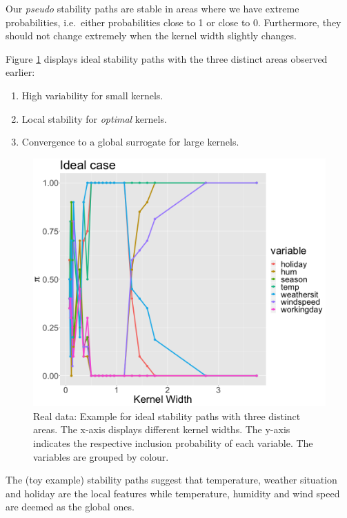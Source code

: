 \documentclass[
]{krantz}
\begin{document}
Our \emph{pseudo} stability paths are stable in areas where we have extreme probabilities, i.e.~either probabilities close to 1 or close to 0.
Furthermore, they should not change extremely when the kernel width slightly changes.

Figure \ref{fig:lime-fig131} displays ideal stability paths with the three distinct areas observed earlier:

\begin{enumerate}
\def\labelenumi{\arabic{enumi}.}
\item
  High variability for small kernels.
\item
  Local stability for \emph{optimal} kernels.
\item
  Convergence to a global surrogate for large kernels.
\end{enumerate}

\begin{figure}

{\centering \includegraphics[width=0.99\linewidth]{images/04-09-14} 

}

\caption{Real data: Example for ideal stability paths with three distinct areas. The x-axis displays different kernel widths. The y-axis indicates the respective inclusion probability of each variable. The variables are grouped by colour.}\label{fig:lime-fig131}
\end{figure}

The (toy example) stability paths suggest that temperature, weather situation and holiday are the local features while temperature, humidity and wind speed are deemed as the global ones.
\end{document}
